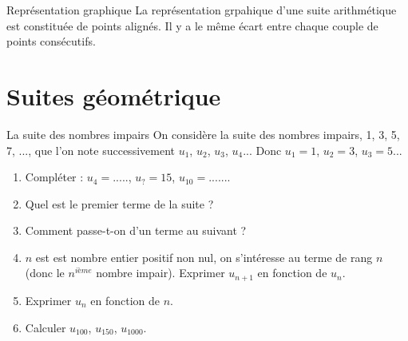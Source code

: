 \documentclass[12pt,a4paper]{article}
\begin{document}
\begin{mybilan}{Représentation graphique}
	La représentation grpahique d'une suite arithmétique est constituée de points alignés. Il y a le même écart entre chaque couple de points consécutifs.
\end{mybilan}
\section{Suites géométrique}

\begin{myact}{La suite des nombres impairs}
	On considère la suite des nombres impairs, 1, 3, 5, 7, ..., que l'on note successivement $u_1$, $u_2$, $u_3$, $u_4$...
	Donc $u_1=1$, $u_2=3$, $u_3=5$...\\
	
	\begin{enumerate}
		\item Compléter : $u_4=.....$, $u_? =15$, $u_{10}=......$.
		\item Quel est le premier terme de la suite ?
		\item Comment passe-t-on d'un terme au suivant ?
		\item $n$ est est nombre entier positif non nul, on s'intéresse au terme de rang $n$ (donc le $n^{ième}$ nombre impair). Exprimer $u_{n+1}$ en fonction de $u_n$.
		\item Exprimer $u_n$ en fonction de $n$.
		\item Calculer $u_{100}$, $u_{150}$, $u_{1000}$.
	\end{enumerate}
	
\end{myact}
\end{document}
